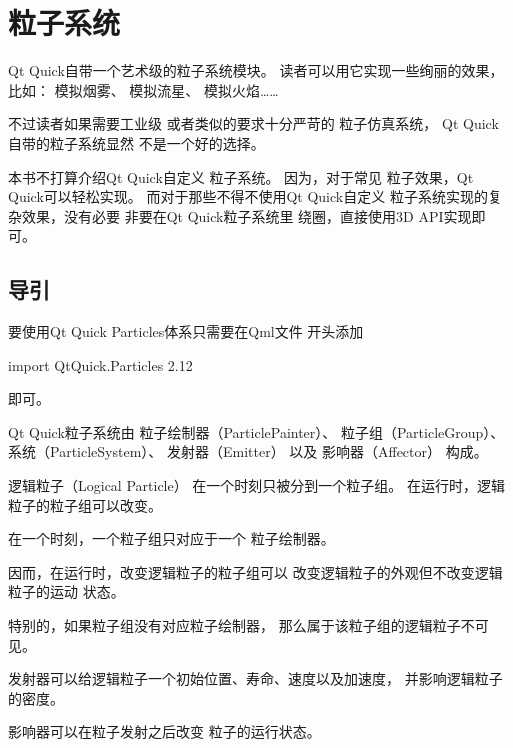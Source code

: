 ﻿




\cleardoublepage
\chapter{
粒子系统
}\label{c000014}


Qt Quick自带一个艺术级的粒子系统模块。
读者可以用它实现一些绚丽的效果，比如：
模拟烟雾、
模拟流星、
模拟火焰……

不过读者如果需要工业级
或者类似的要求十分严苛的
粒子仿真系统，
Qt Quick自带的粒子系统显然
不是一个好的选择。

本书不打算介绍Qt Quick自定义
粒子系统。
因为，对于常见
粒子效果，Qt Quick可以轻松实现。
而对于那些不得不使用Qt Quick自定义
粒子系统实现的复杂效果，没有必要
非要在Qt Quick粒子系统里
绕圈，直接使用3D API实现即可。

\FloatBarrier
\section{
导引
}\label{c000014s01}


\begin{comment}
https://www.kancloud.cn/cloudcastle/qt5-demo/109870
Using the Qt Quick Particle System
http://doc.qt.io/qt-5/qtquick-effects-particles.html
\end{comment}

要使用Qt Quick Particles体系只需要在Qml文件
开头添加\begin{littlelongworld}
import QtQuick.Particles 2.12
\end{littlelongworld}
即可。

Qt Quick粒子系统由
粒子绘制器（ParticlePainter）、
粒子组（ParticleGroup）、
系统（ParticleSystem）、
发射器（Emitter）
以及
影响器（Affector）
构成。

逻辑粒子（Logical Particle）
在一个时刻只被分到一个粒子组。
在运行时，逻辑粒子的粒子组可以改变。

在一个时刻，一个粒子组只对应于一个
粒子绘制器。

因而，在运行时，改变逻辑粒子的粒子组可以
改变逻辑粒子的外观但不改变逻辑粒子的运动
状态。

特别的，如果粒子组没有对应粒子绘制器，
那么属于该粒子组的逻辑粒子不可见。

发射器可以给逻辑粒子一个初始位置、寿命、速度以及加速度，
并影响逻辑粒子的密度。

影响器可以在粒子发射之后改变
粒子的运行状态。

